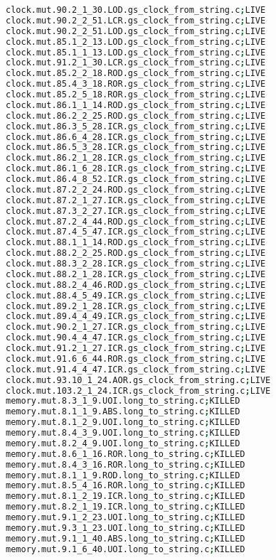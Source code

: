 \begin{lstlisting}[language=bash, label=statuses, caption=Mutants statuses.]
clock.mut.90.2_1_30.LOD.gs_clock_from_string.c;LIVE
clock.mut.90.2_2_51.LCR.gs_clock_from_string.c;LIVE
clock.mut.90.2_2_51.LOD.gs_clock_from_string.c;LIVE
clock.mut.85.1_2_13.LOD.gs_clock_from_string.c;LIVE
clock.mut.85.1_1_13.LOD.gs_clock_from_string.c;LIVE
clock.mut.91.2_1_30.LCR.gs_clock_from_string.c;LIVE
clock.mut.85.2_2_18.ROD.gs_clock_from_string.c;LIVE
clock.mut.85.4_3_18.ROR.gs_clock_from_string.c;LIVE
clock.mut.85.2_5_18.ROR.gs_clock_from_string.c;LIVE
clock.mut.86.1_1_14.ROD.gs_clock_from_string.c;LIVE
clock.mut.86.2_2_25.ROD.gs_clock_from_string.c;LIVE
clock.mut.86.3_5_28.ICR.gs_clock_from_string.c;LIVE
clock.mut.86.6_4_28.ICR.gs_clock_from_string.c;LIVE
clock.mut.86.5_3_28.ICR.gs_clock_from_string.c;LIVE
clock.mut.86.2_1_28.ICR.gs_clock_from_string.c;LIVE
clock.mut.86.1_6_28.ICR.gs_clock_from_string.c;LIVE
clock.mut.86.4_8_52.ICR.gs_clock_from_string.c;LIVE
clock.mut.87.2_2_24.ROD.gs_clock_from_string.c;LIVE
clock.mut.87.2_1_27.ICR.gs_clock_from_string.c;LIVE
clock.mut.87.3_2_27.ICR.gs_clock_from_string.c;LIVE
clock.mut.87.2_4_44.ROD.gs_clock_from_string.c;LIVE
clock.mut.87.4_5_47.ICR.gs_clock_from_string.c;LIVE
clock.mut.88.1_1_14.ROD.gs_clock_from_string.c;LIVE
clock.mut.88.2_2_25.ROD.gs_clock_from_string.c;LIVE
clock.mut.88.3_2_28.ICR.gs_clock_from_string.c;LIVE
clock.mut.88.2_1_28.ICR.gs_clock_from_string.c;LIVE
clock.mut.88.2_4_46.ROD.gs_clock_from_string.c;LIVE
clock.mut.88.4_5_49.ICR.gs_clock_from_string.c;LIVE
clock.mut.89.2_1_28.ICR.gs_clock_from_string.c;LIVE
clock.mut.89.4_4_49.ICR.gs_clock_from_string.c;LIVE
clock.mut.90.2_1_27.ICR.gs_clock_from_string.c;LIVE
clock.mut.90.4_4_47.ICR.gs_clock_from_string.c;LIVE
clock.mut.91.2_1_27.ICR.gs_clock_from_string.c;LIVE
clock.mut.91.6_6_44.ROR.gs_clock_from_string.c;LIVE
clock.mut.91.4_4_47.ICR.gs_clock_from_string.c;LIVE
clock.mut.93.10_1_24.AOR.gs_clock_from_string.c;LIVE
clock.mut.103.2_1_24.ICR.gs_clock_from_string.c;LIVE
memory.mut.8.3_1_9.UOI.long_to_string.c;KILLED
memory.mut.8.1_1_9.ABS.long_to_string.c;KILLED
memory.mut.8.1_2_9.UOI.long_to_string.c;KILLED
memory.mut.8.4_3_9.UOI.long_to_string.c;KILLED
memory.mut.8.2_4_9.UOI.long_to_string.c;KILLED
memory.mut.8.6_1_16.ROR.long_to_string.c;KILLED
memory.mut.8.4_3_16.ROR.long_to_string.c;KILLED
memory.mut.8.1_1_9.ROD.long_to_string.c;KILLED
memory.mut.8.5_4_16.ROR.long_to_string.c;KILLED
memory.mut.8.1_2_19.ICR.long_to_string.c;KILLED
memory.mut.8.2_1_19.ICR.long_to_string.c;KILLED
memory.mut.9.1_2_23.UOI.long_to_string.c;KILLED
memory.mut.9.3_1_23.UOI.long_to_string.c;KILLED
memory.mut.9.1_1_40.ABS.long_to_string.c;KILLED
memory.mut.9.1_6_40.UOI.long_to_string.c;KILLED

\end{lstlisting}
